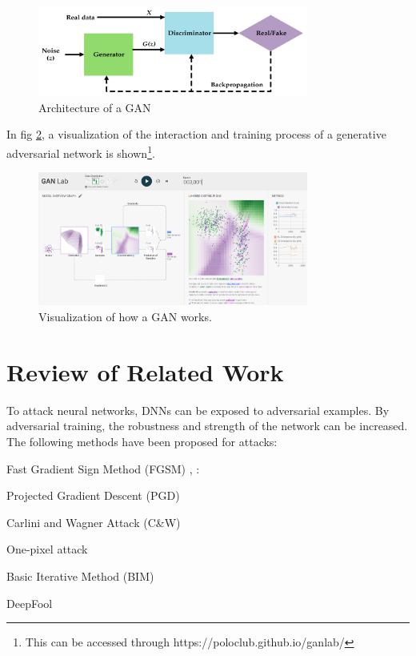 \documentclass[lettersize,journal]{IEEEtran}
\begin{document}
\begin{figure}[!t]
\centering
\includegraphics[width=3.5in]{ganArch.PNG}
\caption{Architecture of a GAN \cite{Goodfellow2014GenerativeAN}}
\label{ganArch}
\end{figure}

In fig \ref{ganlab}, a visualization of the interaction and training process of a generative adversarial network is shown\footnote{This can be accessed through {https://poloclub.github.io/ganlab/}}.

\begin{figure}[!t]
\centering
\includegraphics[width=3.5in]{ganlab.PNG}
\caption{Visualization of how a GAN works.}
\label{ganlab}
\end{figure}

\section{Review of Related Work}
To attack neural networks, DNNs can be exposed to adversarial examples.  By adversarial training, the robustness and strength of the network can be increased. The following methods have been proposed for attacks:

\begin{list}{-}{}
\item Fast Gradient Sign Method (FGSM) \cite{Goodfellow2015ExplainingAH}, \cite{Kurakin2017AdversarialEI}: 
\item Projected Gradient Descent (PGD) \cite{Kurakin2017AdversarialML}
\item Carlini and Wagner Attack (C\&W) \cite{Carlini2017TowardsET}
\item One-pixel attack \cite{Su2019OnePA}
\item Basic Iterative Method (BIM) \cite{Kurakin2017AdversarialEI}
\item DeepFool \cite{MoosaviDezfooli2016DeepFoolAS}
\end{list}
\end{document}
